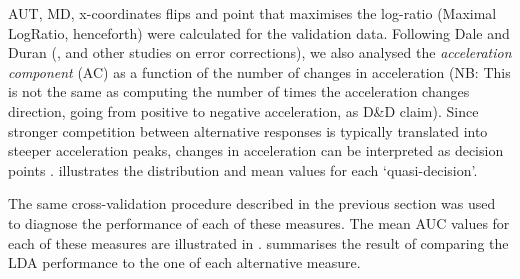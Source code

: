 \documentclass{article}
\newcommand{\addMM}[1]{{\leavevmode\color{red}#1}}
\begin{document}
AUT, MD, x-coordinates flips and point that maximises the log-ratio (Maximal LogRatio, henceforth) were calculated for the validation data. 
Following Dale and Duran (\citeyear{Dale2011}, and other studies on error corrections), we also analysed the \emph{acceleration component} (AC) as a function of the number of changes in acceleration \addMM{(NB: This is not the same as computing the number of times the acceleration changes direction, going from positive to negative acceleration, as D\&D claim)}. 
Since stronger competition between alternative responses is typically translated into steeper acceleration peaks, changes in acceleration can be interpreted as decision points \citep{Hehman2014}.   
 illustrates the distribution and mean values for each `quasi-decision'.

The same cross-validation procedure described in the previous section was used to diagnose the performance of each of these measures. The mean AUC values for each of these measures are illustrated in .  summarises the result of comparing the LDA performance to the one of each alternative measure. 
\end{document}

